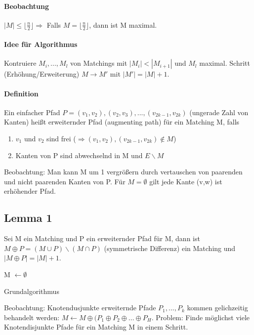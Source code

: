 \paragraph{Beobachtung} $ |M| \leq \lfloor \frac{n}{2} \rfloor \Rightarrow$ Falls $ M = \lfloor \frac{n}{2} \rfloor $, dann ist M maximal.

\paragraph{Idee für Algorithmus} Kontruiere $ M_i,...,M_l $ von Matchings mit $ |M_i| < |M_{i+1}| $ und $ M_l $ maximal. Schritt (Erhöhung/Erweiterung) $ M \rightarrow M' $ mit $ |M'| = |M| + 1 $.

\paragraph{Definition} Ein einfacher Pfad $ P = (v_1, v_2), (v_2, v_3), ..., (v_{2k-1}, v_{2k}) $ (ungerade Zahl von Kanten) heißt erweiternder Pfad (augmenting path) für ein Matching M, falls 
\begin{enumerate}
    \item $ v_1 $ und $ v_2 $ sind frei ($ \Rightarrow (v_1, v_2), (v_{2k-1}, v_{2k}) \notin M$)
    \item Kanten von P sind abwechselnd in M und $ E\backslash M $
\end{enumerate}
Beobachtung: Man kann M um 1 vergrößern durch vertauschen von paarenden und nicht paarenden Kanten von P. Für $ M = \emptyset $ gilt jede Kante (v,w) ist erhöhender Pfad. 

\subsection{Lemma 1} Sei M ein Matching und P ein erweiternder Pfad für M, dann ist $ M \oplus P = (M \cup P) \backslash (M \cap P) $ (symmetrische Differenz) ein Matching und $ |M \oplus P| = |M| + 1 $. 

\begin{algorithm}[H]
\SetAlgoLined
M $ \gets \emptyset $\;
 \caption{Grundalgorithmus }
\end{algorithm}
Beobachtung: Knotendusjunkte erweiternde Pfade $ P_1,...,P_k $ kommen gelichzeitig behandelt werden: $ M\gets M \oplus (P_1 \oplus P_2 \oplus ... \oplus P_H $. Problem: Finde möglichst viele Knotendisjunkte Pfade für ein Matching M in einem Schritt.

